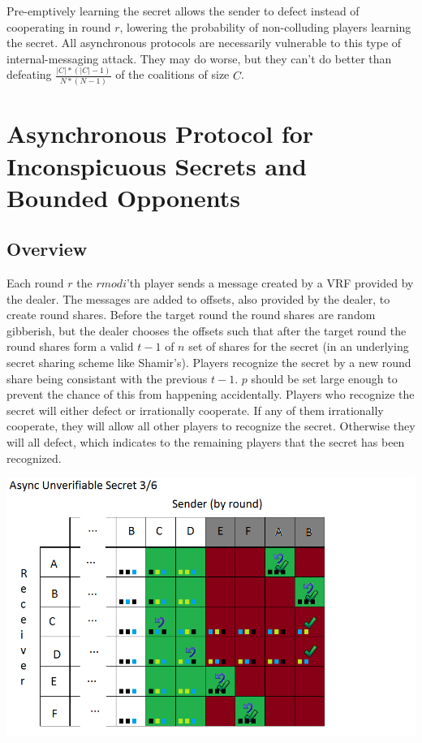 \documentclass{dalcsthesis}
\begin{document}
Pre-emptively learning the secret allows the sender to defect instead of cooperating in round $r$, lowering the probability of non-colluding players learning the secret. All asynchronous protocols are necessarily vulnerable to this type of internal-messaging attack. They may do worse, but they can't do better than defeating $\frac{|C|*(|C| - 1)}{N*(N-1)}$ of the coalitions of size $C$.

\section{Asynchronous Protocol for Inconspicuous Secrets and Bounded Opponents}

\subsection{Overview}

Each round $r$ the $r mod i$'th player sends a message created by a VRF provided by the dealer. The messages are added to offsets, also provided by the dealer, to create round shares. Before the target round the round shares are random gibberish, but the dealer chooses the offsets such that after the target round the round shares form a valid $t-1$ of $n$ set of shares for the secret (in an underlying secret sharing scheme like Shamir's). Players recognize the secret by a new round share being consistant with the previous $t-1$. $p$ should be set large enough to prevent the chance of this from happening accidentally. Players who recognize the secret will either defect or irrationally cooperate. If any of them irrationally cooperate, they will allow all other players to recognize the secret. Otherwise they will all defect, which indicates to the remaining players that the secret has been recognized.

\includegraphics[width=\textwidth]{../../Graphics/AsyncInconspicuous_n6m3.png}
\end{document}
